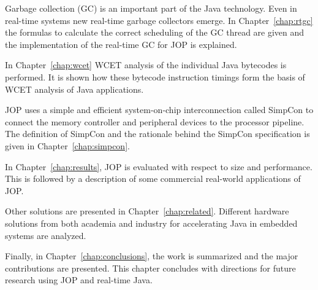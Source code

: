 Garbage collection (GC) is an important part of the Java technology.
Even in real-time systems new real-time garbage collectors emerge.
In Chapter~\ref{chap:rtgc} the formulas to calculate the correct
scheduling of the GC thread are given and the implementation of the
real-time GC for JOP is explained.

In Chapter~\ref{chap:wcet} WCET analysis of the individual Java
bytecodes is performed. It is shown how these bytecode instruction
timings form the basis of WCET analysis of Java applications.

JOP uses a simple and efficient system-on-chip interconnection
called SimpCon to connect the memory controller and peripheral
devices to the processor pipeline. The definition of SimpCon and the
rationale behind the SimpCon specification is given in
Chapter~\ref{chap:simpcon}.


In Chapter~\ref{chap:results}, JOP is evaluated with respect to size
and performance. This is followed by a description of some
commercial real-world applications of JOP.

Other solutions are presented in Chapter~\ref{chap:related}.
Different hardware solutions from both academia and industry for
accelerating Java in embedded systems are analyzed.

Finally, in Chapter~\ref{chap:conclusions}, the work is summarized
and the major contributions are presented. This chapter concludes
with directions for future research using JOP and real-time Java.

